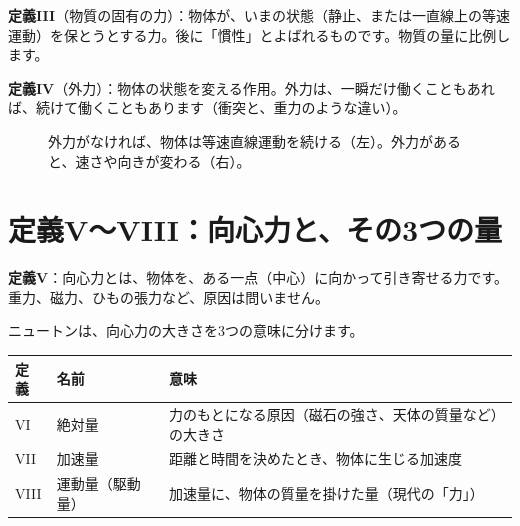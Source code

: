 \documentclass[a4paper,11pt,openany]{ltjsbook}
\begin{document}
\textbf{定義III}（物質の固有の力）：物体が、いまの状態（静止、または一直線上の等速運動）を保とうとする力。後に「慣性」とよばれるものです。物質の量に比例します。

\textbf{定義IV}（外力）：物体の状態を変える作用。外力は、一瞬だけ働くこともあれば、続けて働くこともあります（衝突と、重力のような違い）。

\begin{figure}[htbp]
\centering
{}
\caption{外力がなければ、物体は等速直線運動を続ける（左）。外力があると、速さや向きが変わる（右）。}
\end{figure}

\section{定義V〜VIII：向心力と、その3つの量}

\textbf{定義V}：向心力とは、物体を、ある一点（中心）に向かって引き寄せる力です。重力、磁力、ひもの張力など、原因は問いません。

ニュートンは、向心力の大きさを3つの意味に分けます。

\begin{center}
\renewcommand{\arraystretch}{1.3}
\begin{tabular}{llp{6cm}}
\toprule
定義 & 名前 & 意味\\
\midrule
VI & 絶対量 & 力のもとになる原因（磁石の強さ、天体の質量など）の大きさ\\
VII & 加速量 & 距離と時間を決めたとき、物体に生じる加速度\\
VIII & 運動量（駆動量） & 加速量に、物体の質量を掛けた量（現代の「力」）\\
\bottomrule
\end{tabular}
\end{center}
\end{document}
